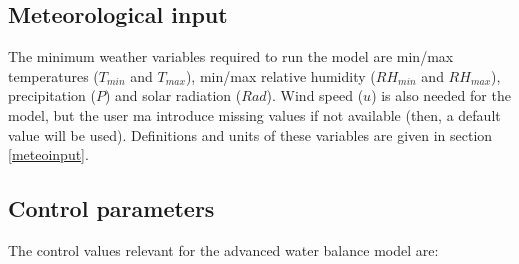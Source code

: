 \documentclass[]{book}
\begin{document}
\hypertarget{meteorological-input}{%
\subsection{Meteorological input}\label{meteorological-input}}

The minimum weather variables required to run the model are min/max temperatures (\(T_{min}\) and \(T_{max}\)), min/max relative humidity (\(RH_{min}\) and \(RH_{max}\)), precipitation (\(P\)) and solar radiation (\(Rad\)). Wind speed (\(u\)) is also needed for the model, but the user ma introduce missing values if not available (then, a default value will be used). Definitions and units of these variables are given in section \ref{meteoinput}.

\hypertarget{control-parameters-2}{%
\subsection{Control parameters}\label{control-parameters-2}}

The control values relevant for the advanced water balance model are:
\end{document}
